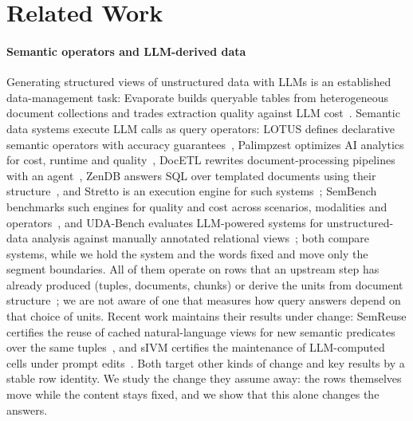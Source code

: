 \documentclass[conference]{IEEEtran}
\begin{document}
\section{Related Work}
\paragraph*{Semantic operators and LLM-derived data} Generating structured views of unstructured data with LLMs is an
established data-management task: Evaporate builds queryable tables from heterogeneous document collections and
trades extraction quality against LLM cost~\cite{evaporate}. Semantic data systems execute LLM calls as query
operators: LOTUS defines declarative semantic operators with accuracy guarantees~\cite{lotus}, Palimpzest optimizes
AI analytics for cost, runtime and quality~\cite{palimpzest}, DocETL rewrites document-processing pipelines with an
agent~\cite{docetl}, ZenDB answers SQL over templated documents using their structure~\cite{zendb}, and Stretto is an
execution engine for such systems~\cite{stretto}; SemBench benchmarks such engines for quality and cost across
scenarios, modalities and operators~\cite{sembench}, and UDA-Bench evaluates LLM-powered systems for unstructured-data
analysis against manually annotated relational views~\cite{udabench}; both compare systems, while we hold the system
and the words fixed and move only the segment boundaries. All of them operate on rows that an upstream step has already
produced (tuples, documents, chunks) or derive the units from document structure~\cite{zendb}; we are not aware
of one that measures how query answers depend on that choice of units. Recent work maintains their results under change: SemReuse certifies the reuse of cached
natural-language views for new semantic predicates over the same tuples~\cite{semreuse}, and sIVM certifies the
maintenance of LLM-computed cells under prompt edits~\cite{sivm}. Both target other kinds of change and key results by
a stable row identity. We study the change they assume away: the rows themselves move while the content stays fixed, and we show that this alone
changes the answers.
\end{document}
